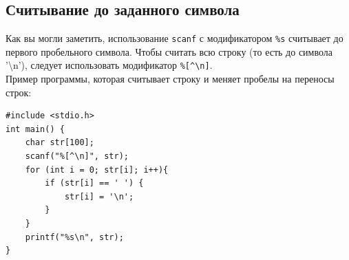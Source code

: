 \documentclass{article}
\begin{document}
\subsection*{Считывание до заданного символа}
Как вы могли заметить, использование \texttt{scanf} с модификатором \texttt{\%s} считывает до первого пробельного символа. Чтобы считать всю строку (то есть до символа '\textbackslash n'), следует использовать модификатор \verb|%[^\n]|. \\
Пример программы, которая считывает строку и меняет пробелы на переносы строк:
\begin{lstlisting}
#include <stdio.h>
int main() {
    char str[100];
    scanf("%[^\n]", str);
    for (int i = 0; str[i]; i++){
        if (str[i] == ' ') {
            str[i] = '\n';
        }
    }
    printf("%s\n", str);
}
\end{lstlisting}
\end{document}
